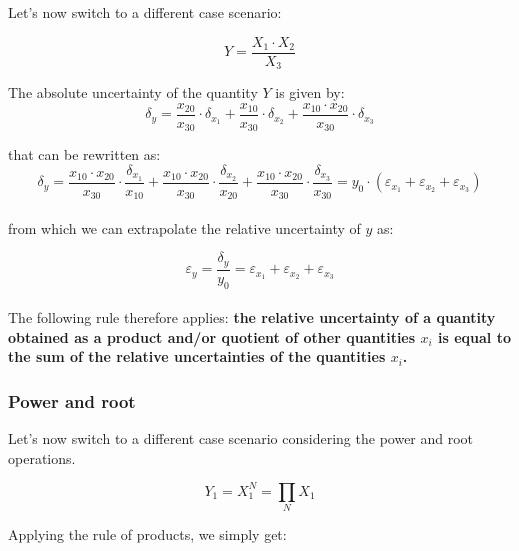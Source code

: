 \documentclass[../main.tex]{subfiles}
\begin{document}
Let's now switch to a different case scenario:

\begin{equation}
	Y = \frac{X_1 \cdot X_2}{X_3} 
\end{equation}

The absolute uncertainty of the quantity $Y$ is given by:\\

\begin{equation}
	\delta_y = \frac{x_{20}}{x_{30}} \cdot \delta_{x_1} + \frac{x_{10}}{x_{30}} \cdot \delta_{x_2} + \frac{x_{10} \cdot x_{20}}{x_{30}} \cdot \delta_{x_3}
\end{equation}

that can be rewritten as:\\

\begin{equation}
	\delta_y = \frac{x_{10} \cdot x_{20}}{x_{30}} \cdot \frac{\delta_{x_1}}{x_{10}} + \frac{x_{10} \cdot x_{20}}{x_{30}} \cdot \frac{\delta_{x_2}}{x_{20}} + \frac{x_{10} \cdot x_{20}}{x_{30}} \cdot \frac{\delta_{x_3}}{x_{30}} = y_0 \cdot (\varepsilon_{x_1} + \varepsilon_{x_2} + \varepsilon_{x_3})
\end{equation}\\

from which we can extrapolate the relative uncertainty of $y$ as:

\begin{equation}
	\varepsilon_y = \frac{\delta_y}{y_0} = \varepsilon_{x_1} + \varepsilon_{x_2} + \varepsilon_{x_3}
\end{equation}\\

The following rule therefore applies: \textbf{the relative uncertainty of a quantity obtained as a product and/or quotient of other quantities $x_i$ is equal to the sum of the relative uncertainties of the quantities $x_i$.}

\subsubsection*{Power and root}

Let's now switch to a different case scenario considering the power and root operations.

\begin{equation}
	Y_1 = X_1^N = \prod_N X_1 	
\end{equation}

Applying the rule of products, we simply get:
\end{document}
